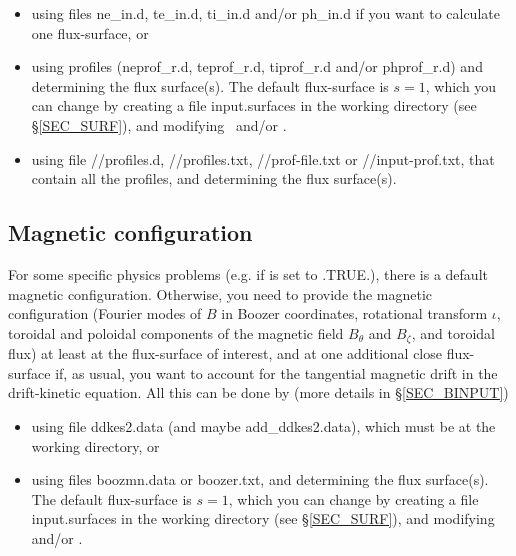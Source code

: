 \begin{itemize} 
\item using files  {\ttfamily ne\_in.d}, {\ttfamily te\_in.d}, {\ttfamily ti\_in.d} and/or {\ttfamily ph\_in.d} if you want to calculate one flux-surface, or
\item using profiles ({\ttfamily neprof\_r.d}, {\ttfamily teprof\_r.d}, {\ttfamily tiprof\_r.d} and/or {\ttfamily phprof\_r.d}) and determining the flux surface(s). The default flux-surface is $s=1$, which you can change by creating a file {\ttfamily input.surfaces} in the working directory (see \S\ref{SEC_SURF}), and modifying~ and/or .
\item using file {\ttfamily //profiles.d}, {\ttfamily //profiles.txt}, {\ttfamily //prof-file.txt} or {\ttfamily //input-prof.txt}, that contain all the profiles, and determining the flux surface(s).
\end{itemize}



\subsection{Magnetic configuration}

For some specific physics problems (e.g. if  is set to {\ttfamily  .TRUE.}), there is a default magnetic configuration. Otherwise, you need to provide the magnetic configuration (Fourier modes of $B$ in Boozer coordinates, rotational transform $\iota$, toroidal and poloidal components of the magnetic field $B_\theta$ and $B_\zeta$, and toroidal flux) at least at the flux-surface of interest, and at one additional close flux-surface if, as usual, you want to account for the tangential magnetic drift in the drift-kinetic equation. All this can be done by (more details in \S\ref{SEC_BINPUT})

\begin{itemize} 
\item using file {\ttfamily ddkes2.data} (and maybe {\ttfamily add\_ddkes2.data}), which must be at the working directory, or
\item using files  {\ttfamily boozmn.data} or {\ttfamily boozer.txt}, and determining the flux surface(s). The default flux-surface is $s=1$, which you can change by creating a file {\ttfamily input.surfaces} in the working directory (see \S\ref{SEC_SURF}), and modifying~ and/or .
\end{itemize}


